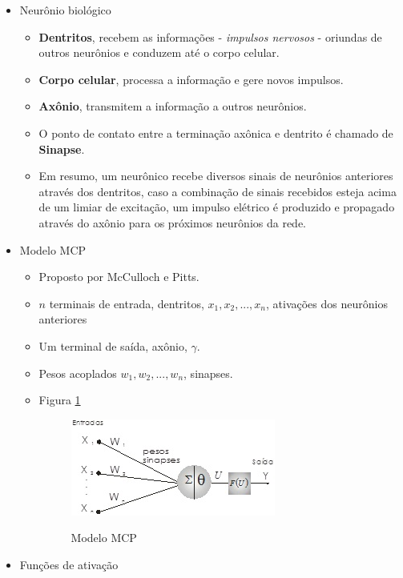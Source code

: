 \documentclass{article}
\begin{document}
\begin{itemize}
	\item Neurônio biológico

	\begin{itemize}
		\item \textbf{Dentritos}, recebem as informações - \textit{impulsos nervosos} - oriundas de outros neurônios e conduzem até o corpo celular.
		\item \textbf{Corpo celular}, processa a informação e gere novos impulsos.
		\item \textbf{Axônio}, transmitem a informação a outros neurônios.
		\item O ponto de contato entre a terminação axônica e dentrito é chamado de \textbf{Sinapse}.
		\item Em resumo, um neurônico recebe diversos sinais de neurônios anteriores através dos dentritos, caso a combinação de sinais recebidos esteja acima de um limiar de excitação, um impulso elétrico é produzido e propagado através do axônio para os próximos neurônios da rede.
	\end{itemize}

	\item Modelo MCP

	\begin{itemize}
		\item Proposto por McCulloch e Pitts.
		\item $n$ terminais de entrada, dentritos, $x_1, x_2, ..., x_n$, ativações dos neurônios anteriores		
		\item Um terminal de saída, axônio, $\gamma$.
		\item Pesos acoplados $w_1, w_2, ..., w_n$, sinapses.
		\item Figura \ref{fig:modelomcp}
		\begin{figure}[h]
			\centering
			\includegraphics{modelomcp}
			\label{fig:modelomcp}
			\caption{Modelo MCP}
		\end{figure}
	\end{itemize}

	\item Funções de ativação


\end{itemize}
\end{document}

